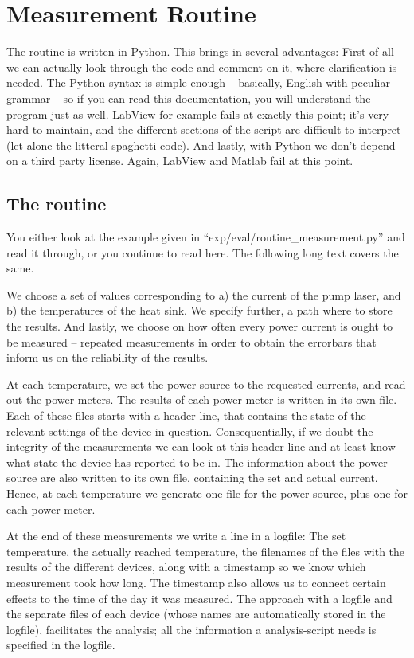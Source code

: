 \section{Measurement Routine}
\label{sec:routine}

The routine is written in Python.
This brings in several advantages:
First of all we can actually look through the code
and comment on it,
where clarification is needed.
The Python syntax is simple enough --
basically, English with peculiar grammar --
so if you can read this documentation,
you will understand the program just as well.
LabView for example
fails at exactly this point;
it's very hard to maintain,
and the different sections
of the script are difficult to interpret
(let alone the litteral spaghetti code).
And lastly,
with Python we don't depend on a third party license.
Again, LabView and Matlab
fail at this point.

\subsection{The routine}
\label{sec:routine:routine}

You either look at the example
given in ``exp/eval/routine\_measurement.py''
and read it through,
or you continue to read here.
The following long text covers the same.

We choose a set of values corresponding to
a) the current of the pump laser,
and b) the temperatures of the heat sink.
We specify further, a path where to store the results.
And lastly, we choose on how often every power current
is ought to be measured --
repeated measurements in order to obtain
the errorbars
that inform us on the reliability of the results.

At each temperature,
we set the power source to the requested currents,
and read out the power meters.
The results of each power meter is written in its own file.
Each of these files starts with a header line,
that contains the state of the relevant settings of the device in question.
Consequentially,
if we doubt the integrity of the measurements
we can look at this header line and
at least know what state the device has reported to be in.
The information about the power source
are also written to its own file,
containing the set and actual current.
Hence, at each temperature we generate
one file for the power source, plus one for each power meter.

At the end of these measurements we write a line in a logfile:
The set temperature,
the actually reached temperature,
the filenames of the files
with the results of the different devices,
along with a timestamp so we know which measurement took how long.
The timestamp also allows us to connect certain effects
to the time of the day it was measured.
The approach with a logfile
and the separate files of each device
(whose names are automatically stored in the logfile),
facilitates the analysis;
all the information a analysis-script needs is specified in the logfile.

